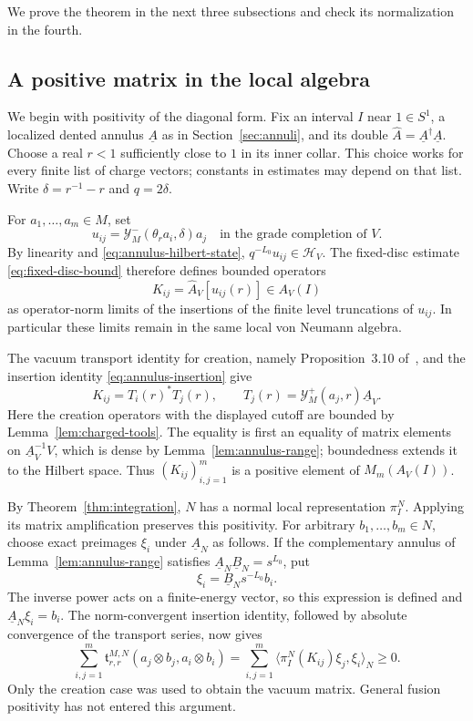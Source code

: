 We prove the theorem in the next three subsections and check its
normalization in the fourth.

\subsection{A positive matrix in the local algebra}

We begin with positivity of the diagonal form.  Fix an interval $I$ near
$1\in S^1$, a localized dented annulus $\underline A$ as in
Section~\ref{sec:annuli}, and its double
$\widehat A=\underline A^\dagger\underline A$.  Choose a real $r<1$
sufficiently close to $1$ in its inner collar.  This choice works for
every finite list of charge vectors; constants in estimates may depend
on that list.  Write $\delta=r^{-1}-r$ and $q=2\delta$.

For $a_1,\ldots,a_m\in M$, set
\[
 u_{ij}=\mathcal Y_M^-(\theta_r a_i,\delta)a_j
 \quad\text{in the grade completion of }V.
\]
By linearity and \eqref{eq:annulus-hilbert-state},
$q^{-L_0}u_{ij}\in\mathcal H_V$.  The fixed-disc estimate
\eqref{eq:fixed-disc-bound} therefore defines bounded operators
\begin{equation}
 K_{ij}=\widehat A_V[u_{ij}(r)]\in A_V(I)
 \label{eq:local-transport-matrix}
\end{equation}
as operator-norm limits of the insertions of the finite level
truncations of $u_{ij}$.  In particular these limits remain in the
same local von Neumann algebra.

The vacuum transport identity for creation, namely
Proposition~3.10 of~\cite{TenerFusion}, and the insertion identity
\eqref{eq:annulus-insertion} give
\begin{equation}
 K_{ij}=T_i(r)^*T_j(r),\qquad
 T_j(r)=\mathcal Y_M^+(a_j,r)\underline A_V.
 \label{eq:transport-gram}
\end{equation}
Here the creation operators with the displayed cutoff are bounded by
Lemma~\ref{lem:charged-tools}.  The equality is first an equality of
matrix elements on $\underline A_V^{-1}V$, which is dense by
Lemma~\ref{lem:annulus-range}; boundedness extends it to the Hilbert
space.  Thus $(K_{ij})_{i,j=1}^m$ is a positive element of
$M_m(A_V(I))$.

By Theorem~\ref{thm:integration}, $N$ has a normal local representation
$\pi_I^N$.  Applying its matrix amplification preserves this
positivity.  For arbitrary $b_1,\ldots,b_m\in N$, choose exact
preimages $\xi_i$ under $\underline A_N$ as follows.  If the
complementary annulus of Lemma~\ref{lem:annulus-range} satisfies
$\underline A_N\underline B_N=s^{L_0}$, put
\[
 \xi_i=\underline B_Ns^{-L_0}b_i.
\]
The inverse power acts on a finite-energy vector, so this expression
is defined and $\underline A_N\xi_i=b_i$.  The norm-convergent
insertion identity, followed by absolute convergence of the
transport series, now gives
\begin{equation}
 \sum_{i,j=1}^m
 \mathfrak t^{M,N}_{r,r}(a_j\otimes b_j,a_i\otimes b_i)
 =\sum_{i,j=1}^m
 \langle\pi_I^N(K_{ij})\xi_j,\xi_i\rangle_N
 \geq0.
 \label{eq:transport-positive}
\end{equation}
Only the creation case was used to obtain the vacuum matrix.  General
fusion positivity has not entered this argument.

